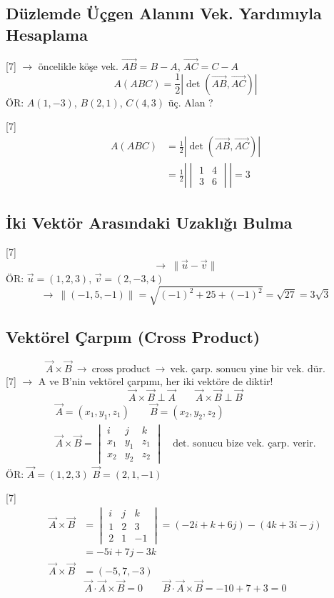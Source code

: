 \documentclass[11pt,a4paper]{article}
\begin{document}
\subsection{Düzlemde Üçgen Alanını Vek. Yardımıyla Hesaplama}
[7]
$\to$ öncelikle köşe vek. \quad $\overrightarrow{AB}=B-A$, \quad $\overrightarrow{AC}=C-A$
\[ A(ABC)=\frac12\left|\det(\overrightarrow{AB},\overrightarrow{AC})\right| \]
ÖR: $A(1,-3)$, $B(2,1)$, $C(4,3)$ üç. Alan ?

[7]
\begin{align*}
A(ABC)&=\frac12\left|\det(\overrightarrow{AB},\overrightarrow{AC})\right|\\
&=\frac12\left|\begin{vmatrix}1&4\\3&6\end{vmatrix}\right|=3
\end{align*}

\subsection{İki Vektör Arasındaki Uzaklığı Bulma}
[7]
\[ \to\ \|\vec u-\vec v\| \]
ÖR: $\vec u=(1,2,3)$, $\vec v=(2,-3,4)$
\[ \to\ \|(-1,5,-1)\|=\sqrt{(-1)^2+25+(-1)^2}=\sqrt{27}=3\sqrt3 \]

\subsection{Vektörel Çarpım (Cross Product)}
\[ \vec A\times\vec B\ \to\ \text{cross product}\ \to\ \text{vek. çarp. sonucu yine bir vek. dür.} \]
[7]
$\to$ A ve B'nin vektörel çarpımı, her iki vektöre de diktir!
\[ \vec A\times\vec B\perp\vec A\qquad \vec A\times\vec B\perp\vec B \]
\begin{gather*}
\vec A=(x_1,y_1,z_1)\qquad \vec B=(x_2,y_2,z_2)\\
\vec A\times\vec B=\begin{vmatrix}i&j&k\\x_1&y_1&z_1\\x_2&y_2&z_2\end{vmatrix}\quad\text{det. sonucu bize vek. çarp. verir.}
\end{gather*}
ÖR: $\vec A=(1,2,3)$ \quad $\vec B=(2,1,-1)$

[7]
\begin{align*}
\vec A\times\vec B&=\begin{vmatrix}i&j&k\\1&2&3\\2&1&-1\end{vmatrix}=(-2i+k+6j)-(4k+3i-j)\\
&=-5i+7j-3k\\
\vec A\times\vec B&=(-5,7,-3)
\end{align*}
\[ \vec A\cdot\vec A\times\vec B=0\qquad \vec B\cdot\vec A\times\vec B=-10+7+3=0 \]
\end{document}
